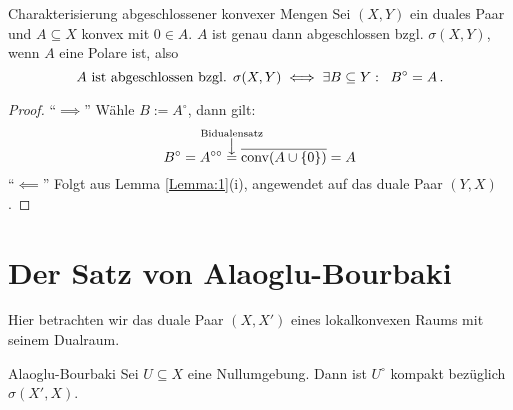\documentclass{article}
\begin{document}
	\begin{Kor}{Charakterisierung abgeschlossener konvexer Mengen}{}
		Sei $(X,Y)$ ein duales Paar und $A\subseteq X$ konvex mit $0\in A$. $A$ ist genau dann abgeschlossen bzgl. $\sigma(X,Y)$, wenn $A$ eine Polare ist, also
		\[A\text{ ist abgeschlossen bzgl. }\sigma(X,Y)\iff \exists B\subseteq Y:\;\; B^{\circ}=A\,.\]
	\end{Kor}
	
	\begin{proof}
		\enquote{$\implies$} Wähle $B:=A^{\circ}$, dann gilt:
		\[B^{\circ}=A^{\circ\circ}\overset{\ms{\text{Bidualensatz}\\\big\downarrow}}{=}\overline{\mathrm{conv}(A\cup \{0\})}=A\]
		\enquote{$\impliedby$} Folgt aus Lemma \ref{Lemma:1}(i), angewendet auf das duale Paar $(Y,X)$.
	\end{proof}
	
	\section{Der Satz von Alaoglu-Bourbaki}
	
	Hier betrachten wir das duale Paar $(X,X')$ eines lokalkonvexen Raums mit seinem Dualraum.
	
	\begin{Satz}{Alaoglu-Bourbaki}{}
		Sei $U\subseteq X$ eine Nullumgebung. Dann ist $U^{\circ}$ kompakt bezüglich $\sigma(X',X)$.
	\end{Satz}
	
\end{document}
